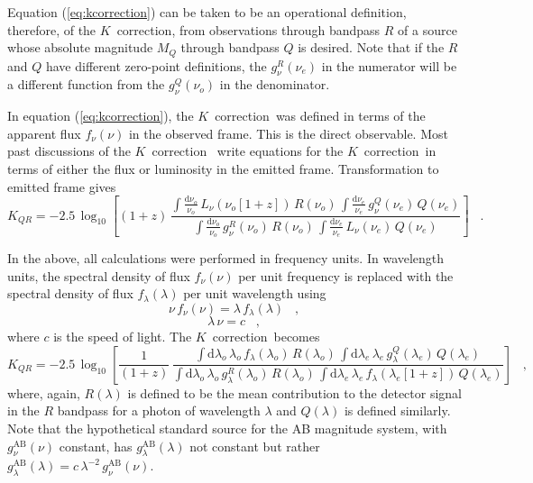 \documentclass[preprint]{aastex}
\newcommand{\kcorrection}{$K$~correction}
\newcommand{\nuobs}{\nu_o}
\newcommand{\nuemit}{\nu_e}
\newcommand{\lambdaobs}{\lambda_o}
\newcommand{\lambdaemit}{\lambda_e}
\begin{document}
Equation (\ref{eq:kcorrection}) can be taken to be an operational
definition, therefore, of the \kcorrection, from observations through
bandpass $R$ of a source whose absolute magnitude $M_Q$ through
bandpass $Q$ is desired.  Note that if the $R$ and $Q$ have different
zero-point definitions, the $g^R_{\nu}(\nuemit)$ in the numerator will
be a different function from the $g^Q_{\nu}(\nuobs)$ in the
denominator.

In equation (\ref{eq:kcorrection}), the \kcorrection\ was defined in
terms of the apparent flux $f_{\nu}(\nu)$ in the observed frame.  This
is the direct observable.  Most past discussions of the \kcorrection\
\citep[eg,][]{oke68a, kim96a} write equations for the \kcorrection\ in
terms of either the flux or luminosity in the emitted frame.
Transformation to emitted frame gives
\begin{equation}
\label{eq:kcorrectionL}
K_{QR} = -2.5\,\log_{10}\left[(1+z)\,
  \frac{\displaystyle
          \int\frac{\mathrm{d}\nuobs}{\nuobs}\,L_{\nu}(\nuobs[1+z])\,R(\nuobs)\,
          \int\frac{\mathrm{d}\nuemit}{\nuemit}\,g^Q_{\nu}(\nuemit)\,Q(\nuemit)}
       {\displaystyle
          \int\frac{\mathrm{d}\nuobs}{\nuobs}\,g^R_{\nu}(\nuobs)\,R(\nuobs)\,
          \int\frac{\mathrm{d}\nuemit}{\nuemit}\,
            L_{\nu}(\nuemit)\,Q(\nuemit)}
\right] \;\;\;.
\end{equation}

In the above, all calculations were performed in frequency units.  In
wavelength units, the spectral density of flux $f_{\nu}(\nu)$ per unit
frequency is replaced with the spectral density of flux
$f_{\lambda}(\lambda)$ per unit wavelength using
\begin{equation}
\nu\,f_{\nu}(\nu) = \lambda\,f_{\lambda}(\lambda) \;\;\;,
\end{equation}
\begin{equation}
\lambda\,\nu = c \;\;\;,
\end{equation}
where $c$ is the speed of light.  The \kcorrection\ becomes
\begin{equation}
\label{eq:wavelength}
K_{QR} = -2.5\,\log_{10}\left[\frac{1}{(1+z)}\,
  \frac{\displaystyle
  \int\mathrm{d}\lambdaobs\,\lambdaobs\,f_{\lambda}(\lambdaobs)\,R(\lambdaobs)\,
    \int\mathrm{d}\lambdaemit\,\lambdaemit\,
    g^Q_{\lambda}(\lambdaemit)\,Q(\lambdaemit)}
       {\displaystyle
  \int\mathrm{d}\lambdaobs\,\lambdaobs\,g^R_{\lambda}(\lambdaobs)\,R(\lambdaobs)\,
    \int\mathrm{d}\lambdaemit\,\lambdaemit\,
    f_{\lambda}(\lambdaemit[1+z])\,Q(\lambdaemit)}
\right] \;\;\;,
\end{equation}
where, again, $R(\lambda)$ is defined to be the mean contribution to
the detector signal in the $R$ bandpass for a photon of wavelength
$\lambda$ and $Q(\lambda)$ is defined similarly.  Note that the
hypothetical standard source for the AB magnitude system, with
$g^\mathrm{AB}_{\nu}(\nu)$ constant, has
$g^\mathrm{AB}_{\lambda}(\lambda)$ not constant but rather
$g^\mathrm{AB}_{\lambda}(\lambda)=
c\,\lambda^{-2}\,g^\mathrm{AB}_{\nu}(\nu)$.
\end{document}
